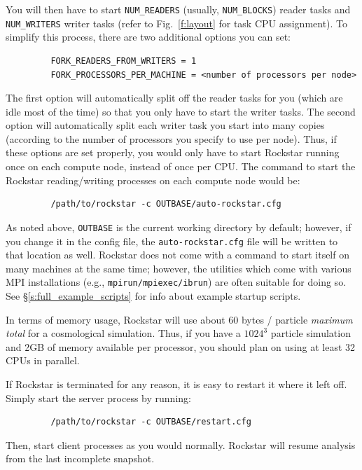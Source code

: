 \documentclass[12pt]{article}
\begin{document}
      You will then have to start \texttt{NUM\_READERS} (usually, \texttt{NUM\_BLOCKS})
      reader tasks and \texttt{NUM\_WRITERS} writer tasks (refer to Fig.\ \ref{f:layout} for task CPU assignment).  To simplify this process,
      there are two additional options you can set:
\begin{verbatim}
         FORK_READERS_FROM_WRITERS = 1
         FORK_PROCESSORS_PER_MACHINE = <number of processors per node>
\end{verbatim}
      The first option will automatically split off the reader tasks for you
      (which are idle most of the time) so that you only have to start the
      writer tasks.  The second option will automatically split each writer
      task you start into many copies (according to the number of processors
      you specify to use per node).  Thus, if these options are set properly, you would
      only have to start Rockstar running once on each compute node, instead of once
      per CPU.  The command to start the Rockstar reading/writing processes on each compute
      node would be:
\begin{verbatim}      
         /path/to/rockstar -c OUTBASE/auto-rockstar.cfg
\end{verbatim}
	As noted above, \texttt{OUTBASE} is the current working directory by default; however, if you change it in the config file, the \texttt{auto-rockstar.cfg} file will be written to that location as well.  Rockstar does not come with a command to start itself on many machines at the same time; however, the utilities which come with various MPI installations (e.g., \texttt{mpirun/mpiexec/ibrun}) are often suitable for doing so.  See \S \ref{s:full_example_scripts} for info about example startup scripts.

      In terms of memory usage, Rockstar will use about 60 bytes / particle
      \textit{maximum total} for a cosmological simulation.  Thus, if you have a
      $1024^3$ particle simulation and 2GB of memory available per processor, you should
      plan on using at least 32 CPUs in parallel.

      If Rockstar is terminated for any reason, it is easy to restart it where
      it left off.  Simply start the server process by running:
\begin{verbatim}
         /path/to/rockstar -c OUTBASE/restart.cfg
\end{verbatim}      
       Then, start client processes
      as you would normally.  Rockstar will resume analysis from the last incomplete
      snapshot.
\end{document}
